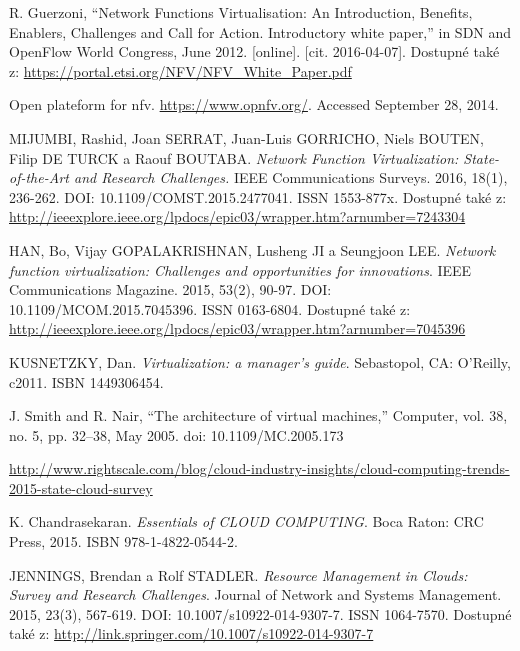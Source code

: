 
 \renewcommand{\appendixname}{Literatura}%

  
\begin{thebibliography}{10}

R. Guerzoni, “Network Functions Virtualisation: An Introduction, Benefits, Enablers, Challenges and Call for Action. Introductory white paper,” in SDN and OpenFlow World Congress, June 2012. [online]. [cit. 2016-04-07]. Dostupné také z: \url{https://portal.etsi.org/NFV/NFV_White_Paper.pdf}


Open plateform for nfv. \url{https://www.opnfv.org/}.  Accessed September 28,
2014.

MIJUMBI, Rashid, Joan SERRAT, Juan-Luis GORRICHO, Niels BOUTEN, Filip DE TURCK a Raouf BOUTABA. \emph{Network Function Virtualization: State-of-the-Art and Research Challenges.} IEEE Communications Surveys. 2016, 18(1), 236-262. DOI: 10.1109/COMST.2015.2477041. ISSN 1553-877x. Dostupné také z: \url{http://ieeexplore.ieee.org/lpdocs/epic03/wrapper.htm?arnumber=7243304}

HAN, Bo, Vijay GOPALAKRISHNAN, Lusheng JI a Seungjoon LEE. \emph{Network function virtualization: Challenges and opportunities for innovations}. IEEE Communications Magazine. 2015, 53(2), 90-97. DOI: 10.1109/MCOM.2015.7045396. ISSN 0163-6804. Dostupné také z: \url{http://ieeexplore.ieee.org/lpdocs/epic03/wrapper.htm?arnumber=7045396}

KUSNETZKY, Dan. \emph{Virtualization: a manager's guide}. Sebastopol, CA: O'Reilly, c2011. ISBN 1449306454.

J. Smith and R. Nair, “The architecture of virtual machines,” Computer, vol. 38, no. 5, pp. 32–38, May 2005. doi: 10.1109/MC.2005.173

\url{http://www.rightscale.com/blog/cloud-industry-insights/cloud-computing-trends-2015-state-cloud-survey}

K. Chandrasekaran. \emph{Essentials of CLOUD COMPUTING}. Boca Raton: CRC Press, 2015. ISBN 978-1-4822-0544-2.

JENNINGS, Brendan a Rolf STADLER. \emph{Resource Management in Clouds: Survey and Research Challenges}. Journal of Network and Systems Management. 2015, 23(3), 567-619. DOI: 10.1007/s10922-014-9307-7. ISSN 1064-7570. Dostupné také z: \url{http://link.springer.com/10.1007/s10922-014-9307-7}


\end{thebibliography}
